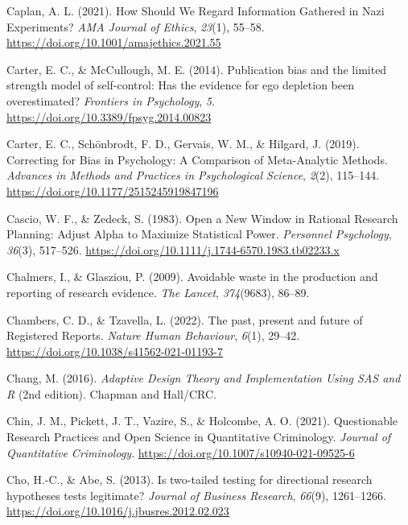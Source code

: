 \documentclass[
  letterpaper,
  DIV=11,
  numbers=noendperiod]{scrreprt}
\newlength{\cslhangindent}
\newlength{\cslentryspacingunit} %
\newenvironment{CSLReferences}[2] %
 {%
  \setlength{\parindent}{0pt}
  \ifodd #1
  \let\oldpar\par
  \def\par{\hangindent=\cslhangindent\oldpar}
  \fi
  \setlength{\parskip}{#2\cslentryspacingunit}
 }%
 {}
\begin{document}
\begin{CSLReferences}{1}{0}
\leavevmode{}%
Caplan, A. L. (2021). How {Should We Regard Information Gathered} in
{Nazi Experiments}? \emph{AMA Journal of Ethics}, \emph{23}(1), 55--58.
\url{https://doi.org/10.1001/amajethics.2021.55}

\leavevmode{}%
Carter, E. C., \& McCullough, M. E. (2014). Publication bias and the
limited strength model of self-control: Has the evidence for ego
depletion been overestimated? \emph{Frontiers in Psychology}, \emph{5}.
\url{https://doi.org/10.3389/fpsyg.2014.00823}

\leavevmode{}%
Carter, E. C., Schönbrodt, F. D., Gervais, W. M., \& Hilgard, J. (2019).
Correcting for {Bias} in {Psychology}: {A Comparison} of {Meta-Analytic
Methods}. \emph{Advances in Methods and Practices in Psychological
Science}, \emph{2}(2), 115--144.
\url{https://doi.org/10.1177/2515245919847196}

\leavevmode{}%
Cascio, W. F., \& Zedeck, S. (1983). Open a {New Window} in {Rational
Research Planning}: {Adjust Alpha} to {Maximize Statistical Power}.
\emph{Personnel Psychology}, \emph{36}(3), 517--526.
\url{https://doi.org/10.1111/j.1744-6570.1983.tb02233.x}

\leavevmode{}%
Chalmers, I., \& Glasziou, P. (2009). Avoidable waste in the production
and reporting of research evidence. \emph{The Lancet}, \emph{374}(9683),
86--89.

\leavevmode{}%
Chambers, C. D., \& Tzavella, L. (2022). The past, present and future of
{Registered Reports}. \emph{Nature Human Behaviour}, \emph{6}(1),
29--42. \url{https://doi.org/10.1038/s41562-021-01193-7}

\leavevmode{}%
Chang, M. (2016). \emph{Adaptive {Design Theory} and {Implementation
Using SAS} and {R}} (2nd edition). {Chapman and Hall/CRC}.

\leavevmode{}%
Chin, J. M., Pickett, J. T., Vazire, S., \& Holcombe, A. O. (2021).
Questionable {Research Practices} and {Open Science} in {Quantitative
Criminology}. \emph{Journal of Quantitative Criminology}.
\url{https://doi.org/10.1007/s10940-021-09525-6}

\leavevmode{}%
Cho, H.-C., \& Abe, S. (2013). Is two-tailed testing for directional
research hypotheses tests legitimate? \emph{Journal of Business
Research}, \emph{66}(9), 1261--1266.
\url{https://doi.org/10.1016/j.jbusres.2012.02.023}


\end{CSLReferences}
\end{document}
